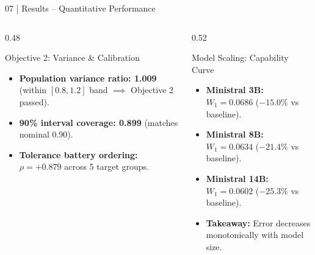 \documentclass[10pt,aspectratio=169]{beamer}
\begin{document}
\begin{frame}{07 | Results -- Quantitative Performance}
    \vspace{0.1cm}
    \begin{columns}[T]
        \begin{column}{0.48\textwidth}
            \begin{block}{Objective 2: Variance \& Calibration}
                \tiny
                \begin{itemize}\itemsep2pt
                    \item \textbf{Population variance ratio: 1.009} (within $[0.8, 1.2]$ band $\implies$ Objective 2 passed).
                    \item \textbf{90\% interval coverage: 0.899} (matches nominal 0.90).
                    \item \textbf{Tolerance battery ordering: $\rho = +0.879$} across 5 target groups.
                \end{itemize}
            \end{block}
        \end{column}
        \begin{column}{0.52\textwidth}
            \begin{block}{Model Scaling: Capability Curve}
                \tiny
                \begin{itemize}\itemsep2pt
                    \item \textbf{Ministral 3B:} $W_1 = 0.0686$ ($-15.0\%$ vs baseline).
                    \item \textbf{Ministral 8B:} $W_1 = 0.0634$ ($-21.4\%$ vs baseline).
                    \item \textbf{Ministral 14B:} $W_1 = 0.0602$ ($-25.3\%$ vs baseline).
                    \item \textbf{Takeaway:} Error decreases monotonically with model size.
                \end{itemize}
            \end{block}
        \end{column}
    \end{columns}
\end{frame}
\end{document}

